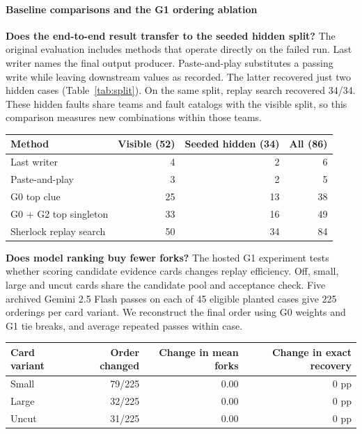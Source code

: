 \documentclass[11pt,letterpaper]{article}
\begin{document}
\paragraph{Baseline comparisons and the G1 ordering ablation}\label{sec:g1}
\textbf{Does the end-to-end result transfer to the seeded hidden split?} The original evaluation includes methods that operate directly on the failed run. Last writer names the final output producer. Paste-and-play substitutes a passing write while leaving downstream values as recorded. The latter recovered just two hidden cases (Table~\ref{tab:split}). On the same split, replay search recovered 34/34. These hidden faults share teams and fault catalogs with the visible split, so this comparison measures new combinations within those teams.

\begin{center}\begin{minipage}{\linewidth}\centering
{}\label{tab:split}
\small\begin{tabular}{lrrr}\toprule
Method & Visible (52) & Seeded hidden (34) & All (86) \\ \midrule
Last writer & 4 & 2 & 6 \\
Paste-and-play & 3 & 2 & 5 \\
G0 top clue & 25 & 13 & 38 \\
G0 + G2 top singleton & 33 & 16 & 49 \\
Sherlock replay search & 50 & 34 & 84 \\
\bottomrule\end{tabular}\end{minipage}\end{center}

\textbf{Does model ranking buy fewer forks?} The hosted G1 experiment tests whether scoring candidate evidence cards changes replay efficiency. Off, small, large and uncut cards share the candidate pool and acceptance check. Five archived Gemini 2.5 Flash passes on each of 45 eligible planted cases give 225 orderings per card variant. We reconstruct the final order using G0 weights and G1 tie breaks, and average repeated passes within case.

\begin{center}\begin{minipage}{\linewidth}\centering
{}\label{tab:g1}
\small\begin{tabular}{lrrr}
\toprule
Card variant & Order changed & Change in mean forks & Change in exact recovery \\
\midrule
Small & 79/225 & 0.00 & 0 pp \\
Large & 32/225 & 0.00 & 0 pp \\
Uncut & 31/225 & 0.00 & 0 pp \\
\bottomrule\end{tabular}
\end{minipage}\end{center}
\end{document}
